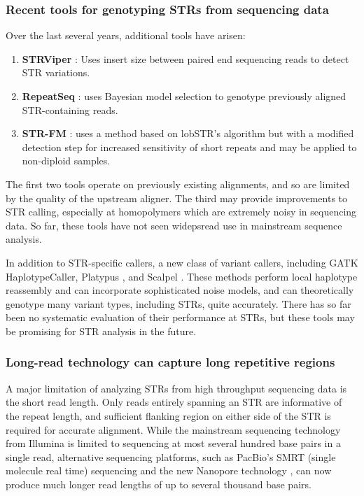 \subsubsection{Recent tools for genotyping STRs from sequencing data}
Over the last several years, additional tools have arisen:

\begin{enumerate}
\item \textbf{STRViper} \cite{CaoTaskerWilladsenEtAl2014}: Uses insert size between paired end sequencing reads to detect STR variations.
\item \textbf{RepeatSeq} \cite{HighnamFranckMartinEtAl2013}: uses Bayesian model selection to genotype previously aligned STR-containing reads.
\item \textbf{STR-FM} \cite{FungtammasanAnandaHileEtAl2015}: uses a method based on lobSTR's algorithm but with a modified detection step for increased sensitivity of short repeats and may be applied to non-diploid samples.
\end{enumerate}

The first two tools operate on previously existing alignments, and so are limited by the quality of the upstream aligner. The third may provide improvements to STR calling, especially at homopolymers which are extremely noisy in sequencing data. So far, these tools have not seen widepsread use in mainstream sequence analysis.

In addition to STR-specific callers, a new class of variant callers, including GATK \cite{McKennaHannaBanksEtAl2010} HaplotypeCaller, Platypus \cite{RimmerPhanMathiesonEtAl2014}, and Scalpel \cite{NarzisiORaweIossifovEtAl2014}. These methods perform local haplotype reassembly and can incorporate sophisticated noise models, and can theoretically genotype many variant types, including STRs, quite accurately. There has so far been no systematic evaluation of their performance at STRs, but these tools may be promising for STR analysis in the future.

\subsubsection{Long-read technology can capture long repetitive regions}
A major limitation of analyzing STRs from high throughput sequencing data is the short read length. Only reads entirely spanning an STR are informative of the repeat length, and sufficient flanking region on either side of the STR is required for accurate alignment. While the mainstream sequencing technology from Illumina is limited to sequencing at most several hundred base pairs in a single read, alternative sequencing platforms, such as PacBio's SMRT (single molecule real time) sequencing \cite{EidFehrGrayEtAl2009} and the new Nanopore technology \cite{ClarkeWuJayasingheEtAl2009}, can now produce much longer read lengths of up to several thousand base pairs.

